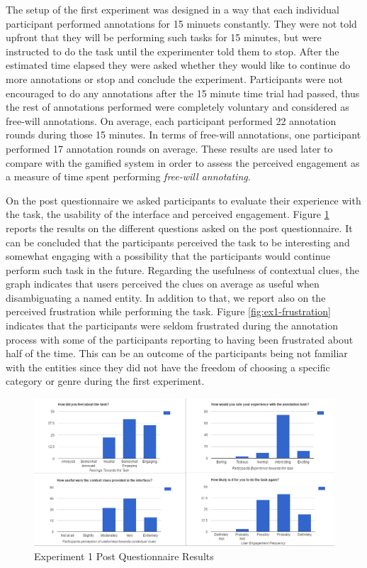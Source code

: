 The setup of the first experiment was designed in a way that each individual participant performed annotations for 15 minuets constantly. They were not told upfront that they will be performing such tasks for 15 minutes, but were instructed to do the task until the experimenter told them to stop. After the estimated time elapsed they were asked whether they would like to continue do more annotations or stop and conclude the experiment. Participants were not encouraged to do any annotations after the 15 minute time trial had passed, thus the rest of annotations performed were completely voluntary and considered as free-will annotations. On average, each participant performed 22 annotation rounds during those 15 minutes. In terms of free-will annotations, one participant performed 17 annotation rounds on average. These results are used later to compare with the gamified system in order to assess the perceived engagement as a measure of time spent performing \textit{free-will annotating}. 

On the post questionnaire we asked participants to evaluate their experience with the task, the usability of the interface and perceived engagement. Figure \ref{fig:ex1-postresults} reports the results on the different questions asked on the post questionnaire. It can be concluded that the participants perceived the task to be interesting and somewhat engaging with a possibility that the participants would continue perform such task in the future. Regarding the usefulness of contextual clues, the graph indicates that users perceived the clues on average as useful when disambiguating a named entity. In addition to that, we report also on the perceived frustration while performing the task. Figure \ref{fig:ex1-frustration} indicates that the participants were seldom frustrated during the annotation process with some of the participants reporting to having been frustrated about half of the time. This can be an outcome of the participants being not familiar with the entities since they did not have the freedom of choosing a specific category or genre during the first experiment. 

\begin{figure}[]
  \includegraphics[width=\linewidth]{figures/experiment1/ex1-postquestionnaire.PNG}
  \caption{Experiment 1 Post Questionnaire Results}
  \label{fig:ex1-postresults}
\end{figure}

